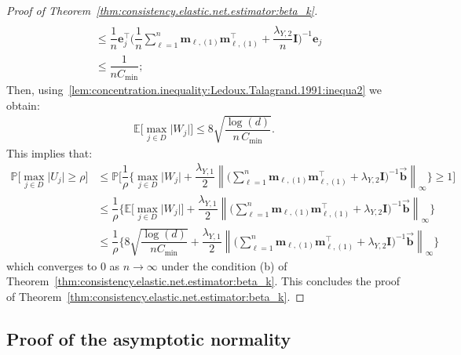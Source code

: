 \documentclass[
  12pt]{article}
\def\E{\mathbb{E}}
\def\M{\mathbf{m}}
\begin{document}
\begin{proof}[Proof of Theorem~\ref{thm:consistency.elastic.net.estimator:beta_k}]
\begin{align*}
		\\
		&\leq  \dfrac{1}{n}   \mathbf{e}_{j}^{\top} \Big( \dfrac{1}{n} \sum_{\ell = 1}^{n} \M_{\ell , (1)} \M_{\ell , (1)}^{\top}  + \dfrac{ \lambda_{Y,2} }{n} \mathbf{I} \Big)^{-1}  \mathbf{e}_{j}
		\\
		&\leq   \dfrac{1}{n C_{\min}} ; 
	\end{align*}
	Then, using~\eqref{lem:concentration.inequality:Ledoux.Talagrand.1991:inequa2} we obtain: 
	\begin{align*}
		\E \Big[ \max_{j \in  D} \big| W_{j} \big| \Big]  \leq  8 \sqrt{ \dfrac{ \log(d) }{n \,  C_{\min}} } . 
	\end{align*}
	This implies that: 
	\begin{align*}  
		\mathbb{P} \Big[ \max_{j \in  D} \big| U_{j} \big| \geq  \rho \Big]
		&\leq  \mathbb{P} \Bigg[  \dfrac{1}{\rho} \Bigg\{  \max_{j \in  D} \big| W_{j} \big| + \dfrac{\lambda_{Y,1}}{2}  \left\|  \big(  \sum_{\ell = 1}^{n} \M_{\ell , (1)} \M_{\ell , (1)}^{\top} +  \lambda_{Y,2} \mathbf{I} \big)^{-1}    \overrightarrow{\mathbf{b}}   \right\|_{\infty}
		\Bigg\}  \geq  1  \Bigg]
		\\
		&\leq   \dfrac{1}{\rho}  \Bigg\{ \E \Big[  \max_{j \in  D} \big| W_{j} \big| \Big]  + \dfrac{\lambda_{Y,1}}{2}  \left\|  \big(  \sum_{\ell = 1}^{n} \M_{\ell , (1)} \M_{\ell , (1)}^{\top} +  \lambda_{Y,2} \mathbf{I} \big)^{-1}    \overrightarrow{\mathbf{b}}   \right\|_{\infty}
		\Bigg\}  
		\\
		&\leq   \dfrac{1}{\rho}  \Bigg\{ 8 \sqrt{ \dfrac{ \log(d)   }{ n C_{\min} } }  + \dfrac{\lambda_{Y,1}}{2}  \left\|  \big(  \sum_{\ell = 1}^{n} \M_{\ell , (1)} \M_{\ell , (1)}^{\top} +  \lambda_{Y,2} \mathbf{I} \big)^{-1}    \overrightarrow{\mathbf{b}}   \right\|_{\infty}
		\Bigg\}  
	\end{align*}
	which converges to $0$ as $n \rightarrow \infty$ under the condition (b)  of Theorem~\ref{thm:consistency.elastic.net.estimator:beta_k}.
	This concludes the proof of Theorem~\ref{thm:consistency.elastic.net.estimator:beta_k}. 
\end{proof}
\subsection{Proof of the asymptotic normality}
\label{sup:asymptotic_normality}
\end{document}
